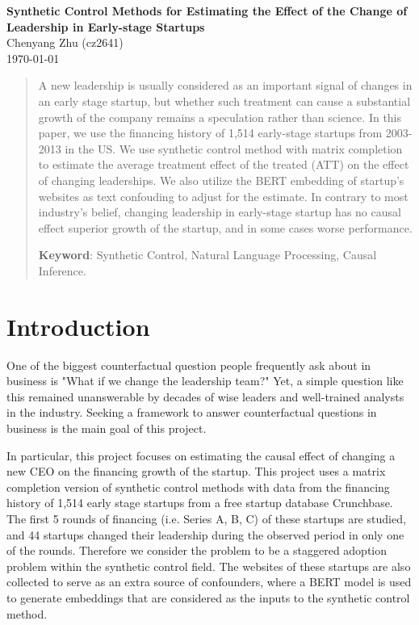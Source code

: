 \documentclass[12pt]{article}
\begin{document}
\large \textbf{Synthetic Control Methods for Estimating the Effect of the Change of Leadership in Early-stage Startups} \\
Chenyang Zhu (cz2641) \\
\today

\vspace{0.1in}

\normalsize


\begin{abstract}
    A new leadership is usually considered as an important signal of changes in an early stage startup, but whether such treatment can cause a substantial growth of the company remains a speculation rather than science. In this paper, we use the financing history of 1,514 early-stage startups from 2003-2013 in the US. We use synthetic control method with matrix completion \cite{athey2021matrix} to estimate the average treatment effect of the treated (ATT) on the effect of changing leaderships. We also utilize the BERT \cite{devlin2018bert} embedding of startup's websites as text confouding to adjust for the estimate. In contrary to most industry's belief, changing leadership in early-stage startup has no causal effect superior growth of the startup, and in some cases worse performance.

\textbf{Keyword}: Synthetic Control, Natural Language Processing, Causal Inference.
\end{abstract}




\section{Introduction}
One of the biggest counterfactual question people frequently ask about in business is "What if we change the leadership team?" Yet, a simple question like this remained unanswerable by decades of wise leaders and well-trained analysts in the industry. Seeking a framework to answer counterfactual questions in business is the main goal of this project.

In particular, this project focuses on estimating the causal effect of changing a new CEO on the financing growth of the startup. This project uses a matrix completion version of synthetic control methods \cite{athey2021matrix} with data from the financing history of 1,514 early stage startups from a free startup database Crunchbase. The first 5 rounds of financing (i.e. Series A, B, C) of these startups are studied, and 44 startups changed their leadership during the observed period in only one of the rounds. Therefore we consider the problem to be a staggered adoption problem within the synthetic control field. The websites of these startups are also collected to serve as an extra source of confounders, where a BERT model is used to generate embeddings \cite{devlin2018bert} that are considered as the inputs to the synthetic control method.
\end{document}
